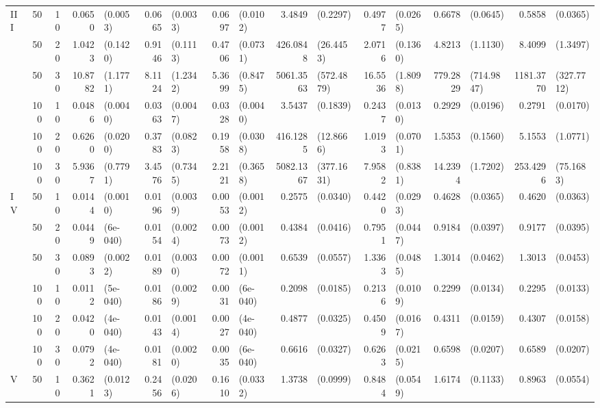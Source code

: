 \begin{landscape}
\begin{table}[H]
\begin{scriptsize}
\begin{tabular}{lrrrlrlrlrlrlrlrl}
   \hline
III & 50 & 10 & 0.0650 & (0.0053) & 0.0665 & (0.0033) & 0.0697 & (0.0102) & 3.4849 & (0.2297) & 0.4977 & (0.0265) & 0.6678 & (0.0645) & 0.5858 & (0.0365) \\ 
    & 50 & 20 & 1.0423 & (0.1420) & 0.9146 & (0.1113) & 0.4706 & (0.0731) & 426.0848 & (26.4453) & 2.0716 & (0.1360) & 4.8213 & (1.1130) & 8.4099 & (1.3497) \\ 
    & 50 & 30 & 10.8782 & (1.1771) & 8.1124 & (1.2342) & 5.3699 & (0.8475) &  5061.3563 & (572.4879) & 16.5536 & (1.8098) & 779.2829 & (714.9847) & 1181.3770 & (327.7712) \\ 
    & 100 & 10 & 0.0486 & (0.0040) & 0.0363 & (0.0047) & 0.0328 & (0.0040) & 3.5437 & (0.1839) & 0.2437 & (0.0130) & 0.2929 & (0.0196) & 0.2791 & (0.0170) \\ 
    & 100 & 20 & 0.6260 & (0.0200) & 0.3783 & (0.0823) & 0.1958 & (0.0308) & 416.1285 & (12.8666) & 1.0193 & (0.0701) & 1.5353 & (0.1560) & 5.1553 & (1.0771) \\ 
    & 100 & 30 & 5.9367 & (0.7791) & 3.4576 & (0.7345) & 2.2121 & (0.3658) & 5082.1367 & (377.1631) & 7.9582 & (0.8381) & 14.2394 & (1.7202) & 253.4296 & (75.1683) \\ 
   \hline
IV & 50 & 10 & 0.0144 & (0.0010) & 0.0196 & (0.0039) & 0.0053 & (0.0012) & 0.2575 & (0.0340) & 0.4420 & (0.0293) & 0.4628 & (0.0365) & 0.4620 & (0.0363) \\ 
    & 50 & 20 & 0.0449 & (6e-040) & 0.0154 & (0.0024) & 0.0073 & (0.0012) & 0.4384 & (0.0416) & 0.7951 & (0.0447) & 0.9184 & (0.0397) & 0.9177 & (0.0395) \\ 
    & 50 & 30 & 0.0893 & (0.0022) & 0.0189 & (0.0030) & 0.0072 & (0.0011) & 0.6539 & (0.0557) & 1.3363 & (0.0485) & 1.3014 & (0.0462) & 1.3013 & (0.0453) \\ 
    & 100 & 10 & 0.0112 & (5e-040) & 0.0186 & (0.0029) & 0.0031 & (6e-040) & 0.2098 & (0.0185) & 0.2136 & (0.0109) & 0.2299 & (0.0134) & 0.2295 & (0.0133) \\ 
    & 100 & 20 & 0.0420 & (4e-040) & 0.0143 & (0.0014) & 0.0027 & (4e-040) & 0.4877 & (0.0325) & 0.4509 & (0.0167) & 0.4311 & (0.0159) & 0.4307 & (0.0158) \\ 
    & 100 & 30 & 0.0792 & (4e-040) & 0.0181 & (0.0020) & 0.0035 & (6e-040) & 0.6616 & (0.0327) & 0.6263 & (0.0215) & 0.6598 & (0.0207) & 0.6589 & (0.0207) \\ 
   \hline
V & 50 & 10 & 0.3621 & (0.0123) & 0.2456 & (0.0206) & 0.1610 & (0.0332) & 1.3738 & (0.0999) & 0.8484 & (0.0549) & 1.6174 & (0.1133) & 0.8963 & (0.0554) \\ 

\end{tabular}
\end{scriptsize}
\end{table}
\end{landscape}
